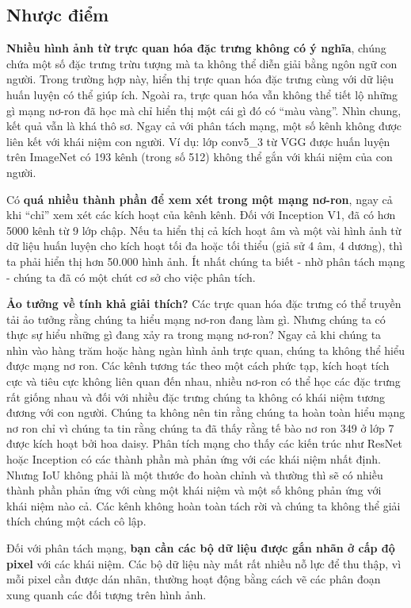\subsection{Nhược điểm}
\textbf{Nhiều hình ảnh từ trực quan hóa đặc trưng không có ý nghĩa}, chúng chứa một số đặc trưng trừu tượng mà ta không thể diễn giải bằng ngôn ngữ con người. Trong trường hợp này, hiển thị trực quan hóa đặc trưng cùng với dữ liệu huấn luyện có thể giúp ích. Ngoài ra, trực quan hóa vẫn không thể tiết lộ những gì mạng nơ-ron đã học mà chỉ hiển thị một cái gì đó có ``màu vàng''. Nhìn chung, kết quả vẫn là khá thô sơ. Ngay cả với phân tách mạng, một số kênh không được liên kết với khái niệm con người. Ví dụ: lớp conv5\_3 từ VGG được huấn luyện trên ImageNet có 193 kênh (trong số 512) không thể gắn với khái niệm của con người.

Có \textbf{quá nhiều thành phần để xem xét trong một mạng nơ-ron}, ngay cả khi ``chỉ'' xem xét các kích hoạt của kênh kênh. Đối với Inception V1, đã có hơn 5000 kênh từ 9 lớp chập. Nếu ta hiển thị cả kích hoạt âm và một vài hình ảnh từ dữ liệu huấn luyện cho kích hoạt tối đa hoặc tối thiểu (giả sử 4 âm, 4 dương), thì ta phải hiển thị hơn 50.000 hình ảnh. Ít nhất chúng ta biết - nhờ phân tách mạng - chúng ta đã có một chút cơ sở cho việc phân tích.

\textbf{Ảo tưởng về tính khả giải thích?} Các trực quan hóa đặc trưng có thể truyền tải ảo tưởng rằng chúng ta hiểu mạng nơ-ron đang làm gì. Nhưng chúng ta có thực sự hiểu những gì đang xảy ra trong mạng nơ-ron? Ngay cả khi chúng ta nhìn vào hàng trăm hoặc hàng ngàn hình ảnh trực quan, chúng ta không thể hiểu được mạng nơ ron. Các kênh tương tác theo một cách phức tạp, kích hoạt tích cực và tiêu cực không liên quan đến nhau, nhiều nơ-ron có thể học các đặc trưng rất giống nhau và đối với nhiều đặc trưng chúng ta không có khái niệm tương đương với con người. Chúng ta không nên tin rằng chúng ta hoàn toàn hiểu mạng nơ ron chỉ vì chúng ta tin rằng chúng ta đã thấy rằng tế bào nơ ron 349 ở lớp 7 được kích hoạt bởi hoa daisy. Phân tích mạng cho thấy các kiến trúc như ResNet hoặc Inception có các thành phần mà phản ứng với các khái niệm nhất định. Nhưng IoU không phải là một thước đo hoàn chỉnh và thường thì sẽ có nhiều thành phần phản ứng với cùng một khái niệm và một số không phản ứng với khái niệm nào cả. Các kênh không hoàn toàn tách rời và chúng ta không thể giải thích chúng một cách cô lập.

Đối với phân tách mạng, \textbf{bạn cần các bộ dữ liệu được gắn nhãn ở cấp độ pixel} với các khái niệm. Các bộ dữ liệu này mất rất nhiều nỗ lực để thu thập, vì mỗi pixel cần được dán nhãn, thường hoạt động bằng cách vẽ các phân đoạn xung quanh các đối tượng trên hình ảnh.


